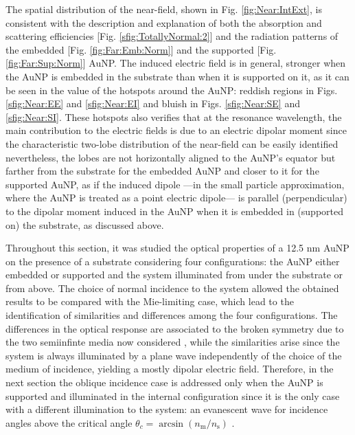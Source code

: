 The spatial distribution of the near-field, shown in Fig. \ref{fig:Near:IntExt}, is consistent with the description and explanation of both the absorption and scattering efficiencies [Fig. \ref{sfig:TotallyNormal:2}] and the radiation patterns of the embedded [Fig. \ref{fig:Far:Emb:Norm}] and the supported [Fig. \ref{fig:Far:Sup:Norm}] AuNP. The induced electric field is in general, stronger when the AuNP is embedded in the substrate than when it is supported on it, as it can be seen in the value of the hotspots around the AuNP: reddish regions in Figs. \ref{sfig:Near:EE} and \ref{sfig:Near:EI} and bluish in Figs. \ref{sfig:Near:SE} and \ref{sfig:Near:SI}. These hotspots also verifies that at the resonance wavelength, the main contribution to the electric fields is due to an electric dipolar moment since the characteristic two-lobe distribution of the near-field can be easily identified nevertheless, the lobes are not horizontally aligned to the AuNP's equator but farther from the substrate for the embedded AuNP and closer to it for the supported AuNP, as if the induced dipole ---in the small particle approximation, where the AuNP is treated as a point electric dipole--- is parallel (perpendicular) to the dipolar moment induced in the AuNP when it is embedded in (supported on) the substrate, as discussed above.

Throughout this section, it was studied the optical properties of a 12.5 nm AuNP on the presence of a substrate considering four configurations: the AuNP either embedded or supported and the system illuminated from under the substrate or from above. The choice of normal incidence to the system allowed the obtained results to be compared with the Mie-limiting case, which lead to the identification of similarities and differences among the four configurations. The differences in the optical response are associated to the broken symmetry due to the two semiinfinte media now considered \cite{meng_anisotropic_2015}, while the similarities arise since the system is always illuminated by a plane wave independently of the choice of the medium of incidence, yielding a mostly dipolar electric field. Therefore, in the next section the oblique incidence case is addressed only when the AuNP is supported and illuminated in the internal configuration since it is the only case with a different illumination to the system: an evanescent wave for incidence angles above the critical angle $\theta_c =\arcsin(n_\text{m}/n_\text{s})$ \cite{born_max_principle_1999}.
